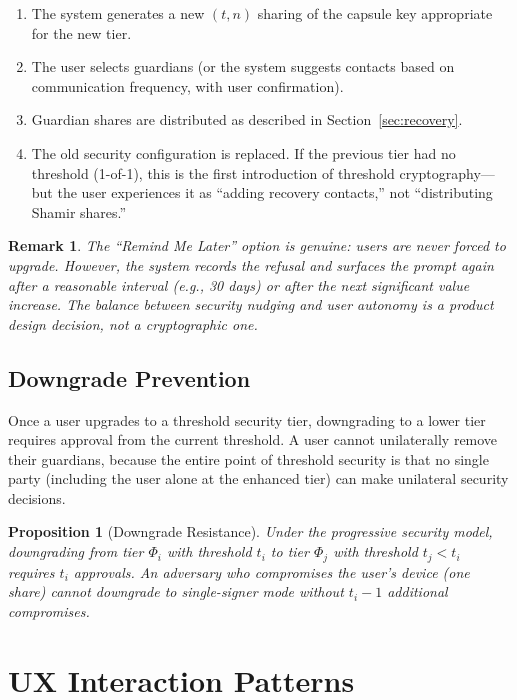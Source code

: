 \documentclass[11pt,a4paper]{article}
\newtheorem{proposition}[theorem]{Proposition}
\newtheorem{remark}{Remark}
\begin{document}
\begin{enumerate}
    \item The system generates a new $(t, n)$ sharing of the capsule key
    appropriate for the new tier.
    \item The user selects guardians (or the system suggests contacts based
    on communication frequency, with user confirmation).
    \item Guardian shares are distributed as described in Section~\ref{sec:recovery}.
    \item The old security configuration is replaced. If the previous tier
    had no threshold (1-of-1), this is the first introduction of threshold
    cryptography---but the user experiences it as ``adding recovery contacts,''
    not ``distributing Shamir shares.''
\end{enumerate}

\begin{remark}
The ``Remind Me Later'' option is genuine: users are never forced to upgrade.
However, the system records the refusal and surfaces the prompt again after
a reasonable interval (e.g., 30 days) or after the next significant value
increase. The balance between security nudging and user autonomy is a
product design decision, not a cryptographic one.
\end{remark}

\subsection{Downgrade Prevention}

Once a user upgrades to a threshold security tier, downgrading to a lower
tier requires approval from the current threshold. A user cannot unilaterally
remove their guardians, because the entire point of threshold security is
that no single party (including the user alone at the enhanced tier) can
make unilateral security decisions.

\begin{proposition}[Downgrade Resistance]
Under the progressive security model, downgrading from tier $\Phi_i$ with
threshold $t_i$ to tier $\Phi_j$ with threshold $t_j < t_i$ requires
$t_i$ approvals. An adversary who compromises the user's device (one share)
cannot downgrade to single-signer mode without $t_i - 1$ additional
compromises.
\end{proposition}

\section{UX Interaction Patterns}\label{sec:ux}
\end{document}
